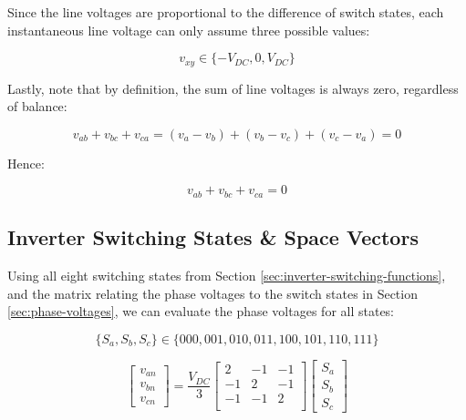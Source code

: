 \documentclass{article}
\begin{document}
Since the line voltages are proportional to the difference of switch states, each instantaneous line voltage can only assume three possible values:

\[
    v_{xy} \in \{-V_{DC}, 0, V_{DC}\}
\]

Lastly, note that by definition, the sum of line voltages is always zero, regardless of balance:

\begin{equation}
    v_{ab} + v_{bc} + v_{ca} = (v_a - v_b) + (v_b - v_c) + (v_c - v_a) = 0
\end{equation}

Hence:

\begin{equation}
    v_{ab} + v_{bc} + v_{ca} = 0
\end{equation}


\subsection{Inverter Switching States \& Space Vectors}
\label{sec:inverter-switching-states-and-space-vectors}

Using all eight switching states from Section \ref{sec:inverter-switching-functions}, and the matrix relating the phase voltages to the switch states in Section \ref{sec:phase-voltages}, we can evaluate the phase voltages for all states:

\[
    \{S_a, S_b, S_c\} \in \{000, 001, 010, 011, 100, 101, 110, 111\}
\]

\begin{equation}
    \begin{bmatrix}
        v_{an} \\
        v_{bn} \\
        v_{cn}
    \end{bmatrix}
    = \frac{V_{DC}}{3}
    \begin{bmatrix}
        2 & -1 & -1 \\
        -1 & 2 & -1 \\
        -1 & -1 & 2 \\
    \end{bmatrix}
    \begin{bmatrix}
        S_a \\
        S_b \\
        S_c
    \end{bmatrix}
\end{equation}
\end{document}
